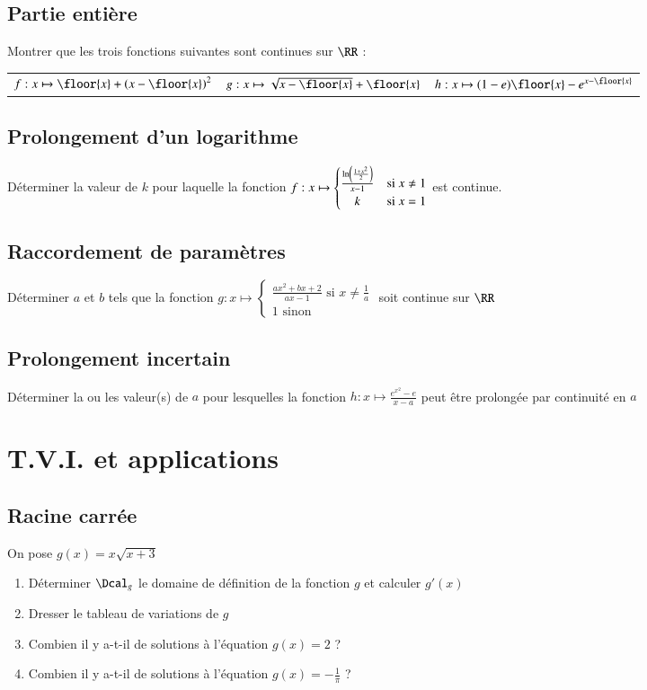 \documentclass[oneside,12pt]{article}          %
\begin{document}
\subsection{Partie entière}
Montrer que les trois fonctions suivantes sont continues sur $\RR$ :\\
\begin{tabular}{p{} p{} p{}}
    $f:x\mapsto\floor{x}+\left(x-\floor{x}\right)^2$ & $g:x\mapsto\sqrt{x-\floor{x}}+\floor{x}$ & $h:x\mapsto(1-e)\floor{x}-e^{x-\floor{x}}$
\end{tabular}



\subsection{Prolongement d'un logarithme}
Déterminer la valeur de $k$ pour laquelle la fonction $f:x\mapsto\begin{cases}\frac{\ln\left(\frac{1+x^2}{2}\right)}{x-1} & \text{si } x\neq1 \\ \hfil k & \text{si } x=1 \end{cases}$ \quad est continue.



\subsection{Raccordement de paramètres}
Déterminer $a$ et $b$ tels que la fonction $g:x\mapsto\begin{cases}\frac{ax^2+bx+2}{ax-1} \text{ si } x\neq\frac{1}{a} \\ 1 \text{ sinon}\end{cases}$ soit continue sur $\RR$



\subsection{Prolongement incertain}
Déterminer la ou les valeur(s) de $a$ pour lesquelles la fonction $h:x\mapsto\frac{e^{x^2}-e}{x-a}$ peut être prolongée par continuité en $a$




\section{T.V.I. et applications}

\subsection{Racine carrée}
On pose $g(x)=x\sqrt{x+3}$
\begin{enumerate}
    \item Déterminer $\Dcal_g$ le domaine de définition de la fonction $g$ et calculer $g'(x)$
    \item Dresser le tableau de variations de $g$
    \item Combien il y a-t-il de solutions à l'équation $g(x)=2$ ?
    \item Combien il y a-t-il de solutions à l'équation $g(x)=-\frac{1}{\pi}$ ?
\end{enumerate}
\end{document}
